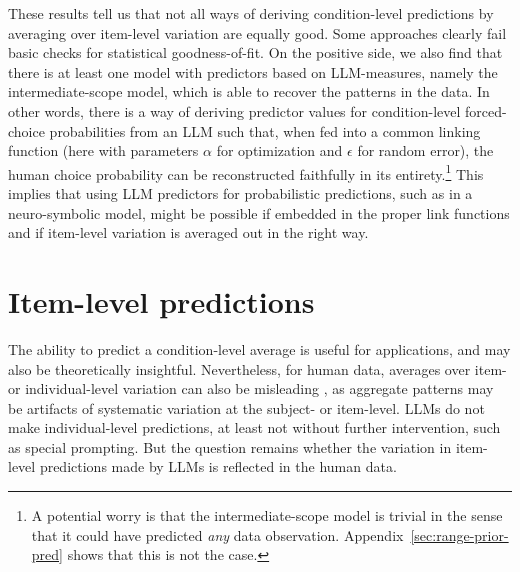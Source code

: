 \documentclass[fleqn]{article}
\begin{document}
These results tell us that not all ways of deriving condition-level predictions by averaging over item-level variation are equally good.
Some approaches clearly fail basic checks for statistical goodness-of-fit.
On the positive side, we also find that there is at least one model with predictors based on LLM-measures, namely the intermediate-scope model, which is able to recover the patterns in the data.
In other words, there is a way of deriving predictor values for condition-level forced-choice probabilities from an LLM such that, when fed into a common linking function (here with parameters $\alpha$ for optimization and $\epsilon$ for random error), the human choice probability can be reconstructed faithfully in its entirety.\footnote{
  A potential worry is that the intermediate-scope model is trivial in the sense that it could have predicted \emph{any} data observation.
  Appendix~\ref{sec:range-prior-pred} shows that this is not the case.
}
This implies that using LLM predictors for probabilistic predictions, such as in a neuro-symbolic model, might be possible if embedded in the proper link functions and if item-level variation is averaged out in the right way.


\section{Item-level predictions}
\label{sec:item-level-pred}

The ability to predict a condition-level average is useful for applications, and may also be theoretically insightful.
Nevertheless, for human data, averages over item- or individual-level variation can also be misleading \citep[e.g.,][]{StanovichWest2000:Individual-diff,EstesMaddox2005:Risks-of-Drawin,HaafRouder2019:Some-do-and-som}, as aggregate patterns may be artifacts of systematic variation at the subject- or item-level.
LLMs do not make individual-level predictions, at least not without further intervention, such as special prompting.
But the question remains whether the variation in item-level predictions made by LLMs is reflected in the human data.
\end{document}
